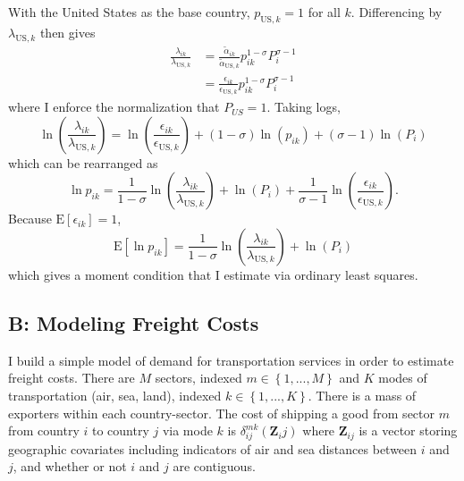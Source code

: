 \documentclass{puthesis}
\newcommand{\E}{\mathrm{E}}
\begin{document}
With the United States as the base country, \(p_{\text{US}, k} = 1\) for
all \(k\). Differencing by \(\lambda_{\text{US}, k}\) then gives
\begin{align*}
\frac{\lambda_{ik}}{\lambda_{\text{US}, k}} &= \frac{\tilde{\alpha}_{ik}}{\tilde{\alpha}_{\text{US}, k}} p_{ik}^{1-\sigma} P_i^{\sigma - 1}
\\
&= \frac{\epsilon_{ik}}{\epsilon_{\text{US},k}} p_{ik}^{1-\sigma} P_i^{\sigma - 1}
\end{align*} where I enforce the normalization that \(P_{US} = 1\).
Taking logs, \[
\ln \left( \frac{\lambda_{ik}}{\lambda_{\text{US}, k}} \right) = \ln \left( \frac{\epsilon_{ik}}{\epsilon_{\text{US},k}} \right) + (1 - \sigma) \ln \left( p_{ik} \right) + (\sigma - 1) \ln \left( P_i \right)
\] which can be rearranged as \[
\ln p_{ik} = \frac{1}{1 - \sigma} \ln \left( \frac{\lambda_{ik}}{\lambda_{\text{US}, k}} \right) + \ln \left( P_i \right) + \frac{1}{\sigma - 1} \ln \left( \frac{\epsilon_{ik}}{\epsilon_{\text{US},k}} \right) .
\] Because \(\E [ \epsilon_{ik} ] = 1\), \[
\E \left[ \ln p_{ik} \right] = \frac{1}{1 - \sigma} \ln \left( \frac{\lambda_{ik}}{\lambda_{\text{US}, k}} \right) + \ln \left( P_i \right) 
\] which gives a moment condition that I estimate via ordinary least
squares.

\subsection{B: Modeling Freight Costs}

I build a simple model of demand for transportation services in order to
estimate freight costs. There are \(M\) sectors, indexed
\(m \in \left\{ 1, ..., M \right\}\) and \(K\) modes of transportation
(air, sea, land), indexed \(k \in \left\{ 1, ..., K \right\}\). There is
a mass of exporters within each country-sector. The cost of shipping a
good from sector \(m\) from country \(i\) to country \(j\) via mode
\(k\) is \(\delta_{ij}^{mk}(\bm{Z}_ij)\) where \(\bm{Z}_{ij}\) is a
vector storing geographic covariates including indicators of air and sea
distances between \(i\) and \(j\), and whether or not \(i\) and \(j\)
are contiguous.
\end{document}
